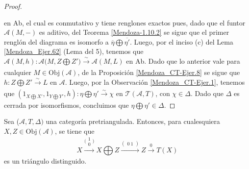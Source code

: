\documentclass[tesis]{subfiles}
\begin{document}
\begin{proof}
    \begin{center}
    \end{center}

    en Ab, el cual es conmutativo y tiene renglones exactos pues, dado que el funtor $\mathscr{A}(M,-)$ es aditivo, del Teorema \ref{Mendoza-1.10.2} se sigue que el primer renglón del diagrama es isomorfo a $\overline{\eta}\bigoplus \overline{\eta'}$. Luego, por el inciso (c) del Lema \ref{Mendoza_Ejer.62} (Lema del 5), tenemos que $\mathscr{A}(M,h):\mathscr{A}\big(M,Z\bigoplus Z'\big)\xrightarrow[]{\sim} \mathscr{A}(M,L)$ en Ab. Dado que lo anterior vale para cualquier $M\in\text{Obj}(\mathscr{A})$, de la Proposición \ref{Mendoza_CT-Ejer.8} se sigue que $h:Z\bigoplus Z'\xrightarrow[]{\sim}L$ en $\mathscr{A}$. Luego, por la Observación \ref{Mendoza_CT-Ejer.1}, tenemos que $(1_{X\bigoplus X'},1_{Y\bigoplus Y'},h):\eta\bigoplus\eta'\xrightarrow[]{\sim}\chi$ en $\mathscr{T}(\mathscr{A},T)$, con $\chi\in\Delta$. Dado que $\Delta$ es cerrada por isomorfismos, concluimos que $\eta\bigoplus\eta'\in\Delta$.
\end{proof}

\begin{Coro}\label{Mendoza_CT-1.6}
    Sea ($\mathscr{A},T,\Delta)$ una categoría pretriangulada. Entonces, para cualesquiera $X,Z\in\text{Obj}(\mathscr{A})$, se tiene que
    \[
        X \xrightarrow[]{\big(\begin{smallmatrix} 1 \\ 0 \end{smallmatrix}\big)} X\bigoplus Z \xrightarrow[]{(\begin{smallmatrix} 0 \ 1 \end{smallmatrix})} Z \xrightarrow[]{0} T(X)
    \] 
    es un triángulo distinguido.
\end{Coro}
\end{document}
